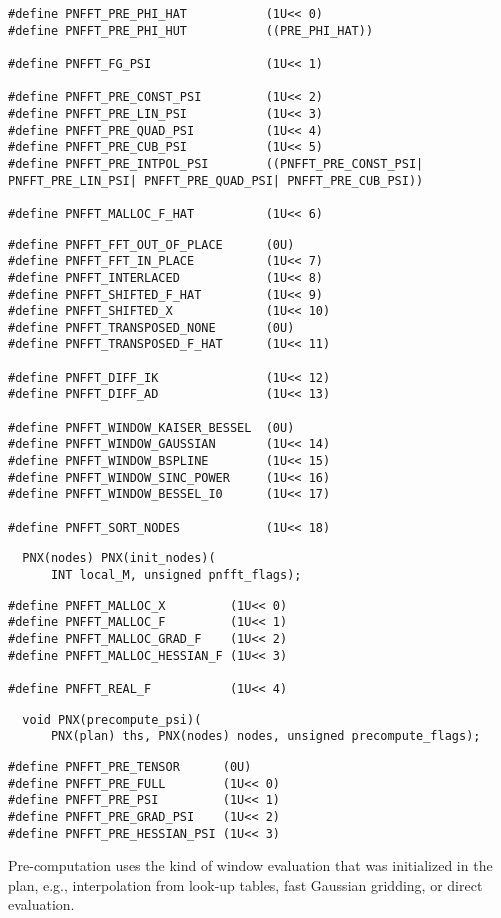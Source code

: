 \documentclass[a4paper,11pt,final,openright,headsepline]{scrreprt}
\numberwithin{figure}{chapter}
\numberwithin{table}{chapter}
\numberwithin{equation}{chapter}
\begin{document}
\begin{lstlisting}
#define PNFFT_PRE_PHI_HAT           (1U<< 0)
#define PNFFT_PRE_PHI_HUT           ((PRE_PHI_HAT))

#define PNFFT_FG_PSI                (1U<< 1)

#define PNFFT_PRE_CONST_PSI         (1U<< 2)
#define PNFFT_PRE_LIN_PSI           (1U<< 3)
#define PNFFT_PRE_QUAD_PSI          (1U<< 4)
#define PNFFT_PRE_CUB_PSI           (1U<< 5)
#define PNFFT_PRE_INTPOL_PSI        ((PNFFT_PRE_CONST_PSI| PNFFT_PRE_LIN_PSI| PNFFT_PRE_QUAD_PSI| PNFFT_PRE_CUB_PSI))

#define PNFFT_MALLOC_F_HAT          (1U<< 6)
\end{lstlisting}
\begin{lstlisting}
#define PNFFT_FFT_OUT_OF_PLACE      (0U)
#define PNFFT_FFT_IN_PLACE          (1U<< 7)
#define PNFFT_INTERLACED            (1U<< 8)
#define PNFFT_SHIFTED_F_HAT         (1U<< 9)
#define PNFFT_SHIFTED_X             (1U<< 10)
#define PNFFT_TRANSPOSED_NONE       (0U)
#define PNFFT_TRANSPOSED_F_HAT      (1U<< 11)

#define PNFFT_DIFF_IK               (1U<< 12)
#define PNFFT_DIFF_AD               (1U<< 13)

#define PNFFT_WINDOW_KAISER_BESSEL  (0U)
#define PNFFT_WINDOW_GAUSSIAN       (1U<< 14)
#define PNFFT_WINDOW_BSPLINE        (1U<< 15)
#define PNFFT_WINDOW_SINC_POWER     (1U<< 16)
#define PNFFT_WINDOW_BESSEL_I0      (1U<< 17)

#define PNFFT_SORT_NODES            (1U<< 18)
\end{lstlisting}




\begin{lstlisting}
  PNX(nodes) PNX(init_nodes)(
      INT local_M, unsigned pnfft_flags);
\end{lstlisting}
\begin{lstlisting}
#define PNFFT_MALLOC_X         (1U<< 0)
#define PNFFT_MALLOC_F         (1U<< 1)
#define PNFFT_MALLOC_GRAD_F    (1U<< 2)
#define PNFFT_MALLOC_HESSIAN_F (1U<< 3)

#define PNFFT_REAL_F           (1U<< 4)
\end{lstlisting}



\begin{lstlisting}
  void PNX(precompute_psi)(
      PNX(plan) ths, PNX(nodes) nodes, unsigned precompute_flags);
\end{lstlisting}
\begin{lstlisting}
#define PNFFT_PRE_TENSOR      (0U)
#define PNFFT_PRE_FULL        (1U<< 0)
#define PNFFT_PRE_PSI         (1U<< 1)
#define PNFFT_PRE_GRAD_PSI    (1U<< 2)
#define PNFFT_PRE_HESSIAN_PSI (1U<< 3)
\end{lstlisting}
Pre-computation uses the kind of window evaluation that was initialized in the plan, e.g., interpolation from look-up tables, fast Gaussian gridding, or direct evaluation.
\end{document}
